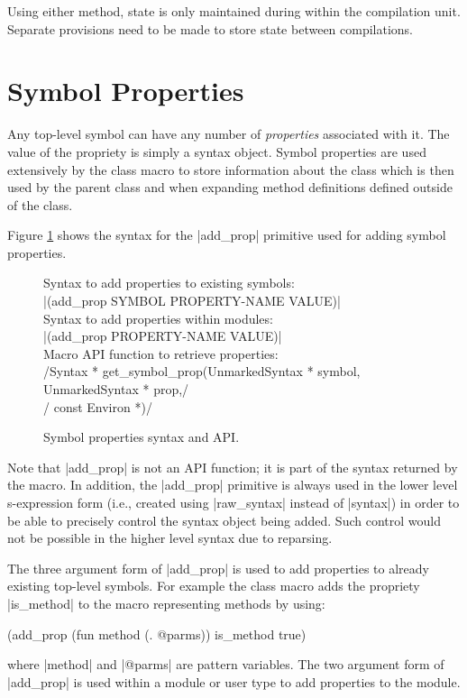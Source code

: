Using either method, state is only maintained during within the
compilation unit.  Separate provisions need to be made to store state
between compilations.

\section{Symbol Properties}
\label{symbol-prop}

Any top-level symbol can have any number of \textit{properties}
associated with it.  The value of the propriety is simply a syntax
object.  Symbol properties are used extensively by the class macro to
store information about the class which is then used by the parent
class and when expanding method definitions defined outside of the
class.

Figure \ref{symbol-prop-fig} shows the syntax for the |add_prop|
primitive used for adding symbol properties.  
\begin{figure}
Syntax to add properties to existing symbols:\\
\hspace*{1em}|(add_prop SYMBOL PROPERTY-NAME VALUE)|\\

Syntax to add properties within modules:\\
\hspace*{1em}|(add_prop PROPERTY-NAME VALUE)|\\

Macro API function to retrieve properties:\\
\hspace*{1em}\sverb/Syntax * get_symbol_prop(UnmarkedSyntax * symbol, UnmarkedSyntax * prop,/\\
\hspace*{1em}\sverb/                         const Environ *)/
\caption{Symbol properties syntax and API.}
\label{symbol-prop-fig}
\end{figure}
Note that |add_prop| is not an API function; it is part of the syntax
returned by the macro.  In addition, the |add_prop| primitive is
always used in the lower level s-expression form (i.e., created using
|raw_syntax| instead of |syntax|) in order to be able to precisely
control the syntax object being added.  Such control would not be
possible in the higher level syntax due to reparsing.

The three argument form of |add_prop| is used to add properties to
already existing top-level symbols.  For example the class macro adds
the propriety |is_method| to the macro representing methods by using:
\begin{code}
(add_prop (fun method (. @parms)) is_method true)
\end{code}
where |method| and |@parms| are pattern variables.  The two argument
form of |add_prop| is used within a module or user type to add
properties to the module.


